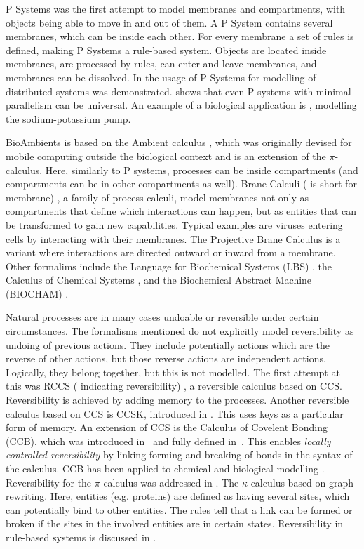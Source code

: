 P Systems \cite{psystems} was the first attempt to model membranes and compartments, with objects being able to move in and out of them. A P System contains several membranes, which can be inside each other. For every membrane a set of rules is defined, making P Systems a rule-based system. Objects are located inside membranes, are processed by rules, can enter and leave membranes, and membranes can be dissolved. In \cite{CIOBANU2003123} the usage of P Systems for modelling of distributed systems was demonstrated. \cite{CIOBANU2007117} shows that even P systems with minimal parallelism can be universal. An example of a biological application is \cite{10.1007/978-3-540-31837-8_12}, modelling the sodium-potassium pump. 

BioAmbients \cite{RegevBioambients} is based on the Ambient calculus \cite{CARDELLI2000177}, which was originally devised for mobile computing outside the biological context and is an extension of the $\pi$-calculus. Here, similarly to P systems, processes can be inside compartments (and compartments can be in other compartments as well). Brane Calculi ( is short for membrane) \cite{CardelliMobileAmbients}, a family of process calculi, model membranes not only as compartments that define which interactions can happen, but as entities that can be transformed to gain new capabilities. Typical examples are viruses entering cells by interacting with their membranes. The Projective Brane Calculus \cite{ProjectiveBrane} is a variant where interactions are directed outward or inward from a membrane. Other formalims include the Language for Biochemical Systems (LBS) \cite{PlotkinLBS}, the Calculus of Chemical Systems \cite{PlotkinCCS}, and the Biochemical Abstract Machine (BIOCHAM) \cite{biocham}. 

Natural processes are in many cases undoable or reversible under certain circumstances. The formalisms mentioned do not explicitly model reversibility as undoing of previous actions. They include potentially actions which are the reverse of other actions, but those reverse actions are independent actions. Logically, they belong together, but this is not modelled. The first attempt at this was RCCS ( indicating reversibility) \cite{10.1007/978-3-540-28644-8_19}, a reversible calculus based on CCS. Reversibility is achieved by adding memory to the processes. Another reversible calculus based on CCS is CCSK, introduced in \cite{PHILLIPS200770}. This uses keys as a particular form of memory. An extension of CCS is the Calculus of Covelent Bonding (CCB), which was introduced in~\cite{KU16} and fully defined in~\cite{KU2017}. This enables \textit{locally controlled reversibility} by linking forming and breaking of bonds in the syntax of the calculus. CCB has been applied to chemical and biological modelling \cite{10.1007/978-3-319-99498-7_8, Kuhn2020ReversibilityIC}. Reversibility for the $\pi$-calculus was addressed in \cite{10.1007/978-3-642-15375-4_33}. The $\kappa$-calculus \cite{DANOS200469} based on graph-rewriting. Here, entities (e.g. proteins) are defined as having several sites, which can potentially bind to other entities. The rules tell that a link can be formed or broken if the sites in the involved entities are in certain states. Reversibility in rule-based systems is discussed in \cite{Aman2020}.
